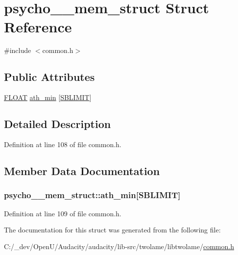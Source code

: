 \hypertarget{structpsycho__0__mem__struct}{}\section{psycho\+\_\+\_\+mem\+\_\+struct Struct Reference}
\label{structpsycho__0__mem__struct}


{\ttfamily \#include $<$common.\+h$>$}

\subsection*{Public Attributes}
\begin{DoxyCompactItemize}
\item 
\hyperlink{twolame_2libtwolame_2common_8h_ae8690abbffa85934d64d545920e2b108}{F\+L\+O\+AT} \hyperlink{structpsycho__0__mem__struct_a433fb0e7b9644dead34be3e417491a77}{ath\+\_\+min} \mbox{[}\hyperlink{twolame_2libtwolame_2common_8h_aae2d5a401c55c6b2b834c99340911fdb}{S\+B\+L\+I\+M\+IT}\mbox{]}
\end{DoxyCompactItemize}


\subsection{Detailed Description}


Definition at line 108 of file common.\+h.



\subsection{Member Data Documentation}
\subsubsection[{\texorpdfstring{ath\+\_\+min}{ath_min}}]{ psycho\+\_\+\_\+mem\+\_\+struct\+::ath\+\_\+min\mbox{[}{\bf S\+B\+L\+I\+M\+IT}\mbox{]}}\hypertarget{structpsycho__0__mem__struct_a433fb0e7b9644dead34be3e417491a77}{}\label{structpsycho__0__mem__struct_a433fb0e7b9644dead34be3e417491a77}


Definition at line 109 of file common.\+h.



The documentation for this struct was generated from the following file\+:\begin{DoxyCompactItemize}
\item 
C\+:/\+\_\+dev/\+Open\+U/\+Audacity/audacity/lib-\/src/twolame/libtwolame/\hyperlink{twolame_2libtwolame_2common_8h}{common.\+h}\end{DoxyCompactItemize}
